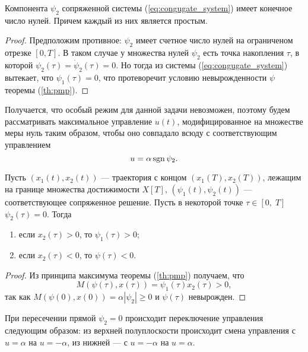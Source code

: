 \begin{assertion}
        Компонента $\psi_2$ сопряженной системы (\ref{eq:congugate_system}) имеет конечное число нулей. Причем каждый из них является простым.
\end{assertion}
\begin{proof}
        Предположим противное: $\psi_2$ имеет счетное число нулей на ограниченом отрезке $[0, T]$. В таком случае у множества нулей $\psi_2$ есть точка накопления $\tau$, в которой $\psi_2(\tau) = \dot \psi_2(\tau) = 0$. Но тогда из системы (\ref{eq:congugate_system}) вытекает, что $\psi_1(\tau) = 0$, что протеворечит условию невырожденности $\psi$ теоремы (\ref{th:pmp}).
\end{proof}
\begin{remark}
        Получается, что особый режим для данной задачи невозможен, поэтому будем рассматривать максимальное управление $u(t)$, модифицированное на множестве меры нуль таким образом, чтобы оно совпадало всюду с соответствующим управлением
        $$
                u = \alpha \operatorname{sgn} \psi_2.
        $$
\end{remark}

\begin{assertion}
        Пусть $(x_1(t), x_2(t))$ --- траектория с концом $(x_1(T), x_2(T))$, лежащим на границе множества достижимости $X[T]$, $(\psi_1(t), \psi_2(t))$ --- соответствующее сопряженное решение. Пусть в некоторой точке $\tau \in [0,\; T]$ $\psi_2(\tau) = 0$. Тогда
        \begin{enumerate}
                \item если $x_2(\tau) > 0$, то $\psi_1(\tau) > 0$;
                \item если $x_2(\tau) < 0$, то $\psi(\tau) < 0$.
        \end{enumerate}
\end{assertion}
\begin{proof}
        Из принципа максимума теоремы (\ref{th:pmp}) получаем, что 
        $$
                M(\psi(\tau),x(\tau)) = \psi_1(\tau) x_2(\tau) > 0,
        $$
        так как $M(\psi(0), x(0)) = \alpha|\psi_2| \geqslant 0$ и $\psi(\tau)$ невырожден. 
\end{proof}
\begin{remark}
        При пересечении прямой $\psi_2 = 0$ происходит переключение управления следующим образом: из верхней полуплоскости происходит смена управления с $u = \alpha$ на $u = -\alpha$, из нижней --- с $u = -\alpha$ на $u = \alpha$.
\end{remark}

